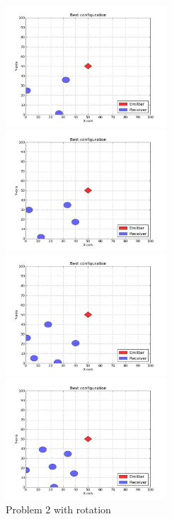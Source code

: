 \documentclass[10pt,a4paper]{book}
\begin{document}
\begin{figure}[H]
\begin{minipage}{60mm}

\includegraphics[width=60mm]{Problem2RotateRecv3.jpg}
\end{minipage}
\begin{minipage}{60mm}

\includegraphics[width=60mm]{Problem2RotateRecv4.jpg}
\end{minipage}
\begin{minipage}{60mm}

\includegraphics[width=60mm]{Problem2RotateRecv5.jpg}
\end{minipage}
\begin{minipage}{60mm}

\includegraphics[width=60mm]{Problem2RotateRecv6.jpg}
\end{minipage}
\caption{Problem 2 with rotation}
\label{problem2rotate}
\end{figure}
\end{document}
